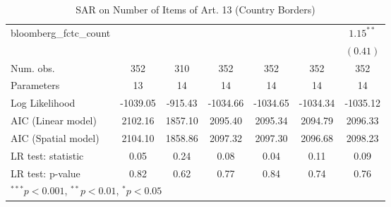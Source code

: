 \begin{table}[!h]
\begin{center}
\begin{tabular}{l c c c c c c }
bloomberg\_fctc\_count  &              &              &              &              &              & $1.15^{**}$  \\
                        &              &              &              &              &              & $(0.41)$     \\
\midrule
Num. obs.               & 352          & 310          & 352          & 352          & 352          & 352          \\
Parameters              & 13           & 14           & 14           & 14           & 14           & 14           \\
Log Likelihood          & -1039.05     & -915.43      & -1034.66     & -1034.65     & -1034.34     & -1035.12     \\
AIC (Linear model)      & 2102.16      & 1857.10      & 2095.40      & 2095.34      & 2094.79      & 2096.33      \\
AIC (Spatial model)     & 2104.10      & 1858.86      & 2097.32      & 2097.30      & 2096.68      & 2098.23      \\
LR test: statistic      & 0.05         & 0.24         & 0.08         & 0.04         & 0.11         & 0.09         \\
LR test: p-value        & 0.82         & 0.62         & 0.77         & 0.84         & 0.74         & 0.76         \\
\bottomrule
\multicolumn{7}{l}{\scriptsize{$^{***}p<0.001$, $^{**}p<0.01$, $^*p<0.05$}}
\end{tabular}
\caption{SAR on Number of Items of Art. 13 (Country Borders)}
\label{table:coefficients}
\end{center}
\end{table}
